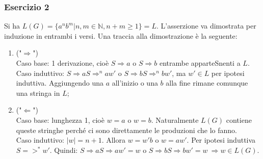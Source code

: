 \documentclass[a4paper,11pt]{article}
\begin{document}
    \subsubsection{Esercizio 2}
Si ha $L(G)=\{a^nb^m|n,m\in\mathbb{N},n+m\geq 1\}=L$. L'asserzione va dimostrata per induzione in entrambi i versi. Una traccia alla dimostrazione è la seguente:
\begin{enumerate}
    \item ("$\Rightarrow$")\\Caso base: 1 derivazione, cioè $S\Rightarrow a$ o $S\Rightarrow b$ entrambe apparteSnenti a $L$.\\Caso induttivo: $S\Rightarrow aS\Rightarrow ^{n}aw'$ o $S\Rightarrow bS\Rightarrow ^{n}bw'$, ma $w' \in L$ per ipotesi induttiva. Aggiungendo una $a$ all'inizio o una $b$ alla fine rimane comunque una stringa in $L$;
    \item ("$\Leftarrow$")\\Caso base: lunghezza 1, cioè $w=a$ o $w=b$. Naturalmente $L(G)$ contiene queste stringhe perché ci sono direttamente le produzioni che lo fanno.\\Caso induttivo: $|w|=n+1$. Allora $w=w'b$ o $w=aw'$. Per ipotesi induttiva $S=>^{*}w'$. Quindi: $S\Rightarrow aS\Rightarrow aw'=w$ o $S\Rightarrow bS\Rightarrow bw'=w \: \Rightarrow w\in L(G)$.
\end{enumerate}
\end{document}
